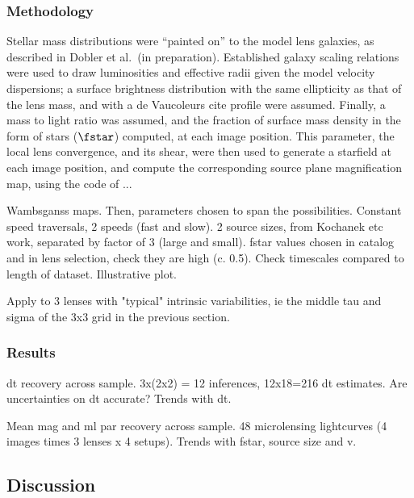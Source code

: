 \documentclass[useAMS,usenatbib, a4paper]{mn2e} \usepackage{natbib}
\begin{document}
\subsubsection{Methodology}


Stellar mass distributions were ``painted on'' to the model lens galaxies, as
described in Dobler et al.\, (in preparation). Established galaxy scaling
relations were used to draw luminosities and effective radii given the model
velocity dispersions; a surface brightness distribution with the same
ellipticity as that of the lens mass, and with a de Vaucoleurs cite profile 
were assumed. Finally, a mass to light ratio was assumed, and the fraction of
surface mass density in the form of stars ($\fstar$) 
computed, at each image position. This parameter, the local lens
convergence, and its shear, were then used to generate a starfield at each
image position, and compute the corresponding source plane magnification map,
using the code of ...

Wambsganss maps. Then, parameters chosen to span the possibilities. Constant
speed traversals, 2 speeds (fast and slow).  2 source sizes, from Kochanek etc
work, separated by factor of 3 (large and small).  fstar values chosen in
catalog and in lens selection, check they are high (c. 0.5).  Check timescales
compared to length of dataset. Illustrative plot. 

Apply to 3 lenses with "typical" intrinsic variabilities, ie the middle tau
and sigma of the 3x3 grid in the previous section. 

\subsubsection{Results}

dt recovery across sample. 3x(2x2) = 12 inferences, 12x18=216 dt estimates.
Are uncertainties on dt accurate? Trends with dt.

Mean mag and ml par recovery across sample. 48 microlensing lightcurves (4
images times 3 lenses x 4 setups). Trends with fstar, source size and v.


\subsection{Discussion}
\end{document}
